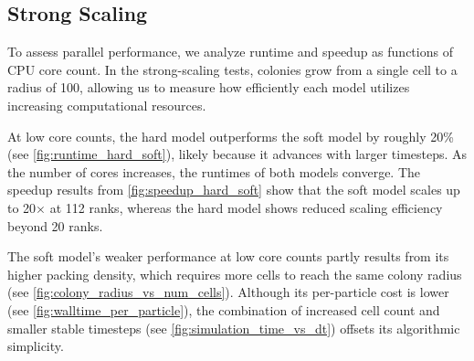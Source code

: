 \documentclass[conference]{IEEEtran}
\begin{document}
\subsection{Strong Scaling}
\label{sec:strong_scaling}

To assess parallel performance, we analyze runtime and speedup as functions of CPU core count. In the strong-scaling tests, colonies grow from a single cell to a radius of 100, allowing us to measure how efficiently each model utilizes increasing computational resources.

At low core counts, the hard model outperforms the soft model by roughly 20\% (see \autoref{fig:runtime_hard_soft}), likely because it advances with larger timesteps. As the number of cores increases, the runtimes of both models converge. The speedup results from \autoref{fig:speedup_hard_soft} show that the soft model scales up to 20$\times$ at 112 ranks, whereas the hard model shows reduced scaling efficiency beyond 20 ranks.

The soft model's weaker performance at low core counts partly results from its higher packing density, which requires more cells to reach the same colony radius (see \autoref{fig:colony_radius_vs_num_cells}). Although its per-particle cost is lower (see \autoref{fig:walltime_per_particle}), the combination of increased cell count and smaller stable timesteps (see \autoref{fig:simulation_time_vs_dt}) offsets its algorithmic simplicity.
\end{document}
